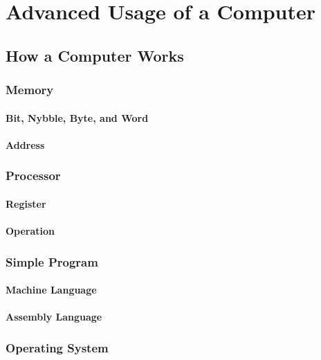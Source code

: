 \documentclass[twocolumn]{book}
\begin{document}
\chapter{Advanced Usage of a Computer}

\section{How a Computer Works}

\subsection{Memory}

\subsubsection{Bit, Nybble, Byte, and Word}

\subsubsection{Address}

\subsection{Processor}

\subsubsection{Register}

\subsubsection{Operation}

\subsection{Simple Program}

\subsubsection{Machine Language}

\subsubsection{Assembly Language}

\subsection{Operating System}
\end{document}
